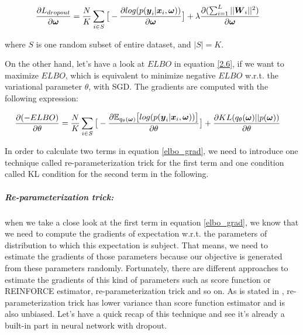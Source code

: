 \begin{equation}
\begin{aligned} \label{dropout_grad}
\frac{\partial L_{dropout}}{\partial \boldsymbol \omega} &=\frac{N}{K}\sum_{i \in S}\big[-\frac{\partial log(p(\boldsymbol y_{i}| \boldsymbol x_{i}, \boldsymbol \omega))}{\partial \boldsymbol \omega}\big] + \lambda\frac{\partial (\sum_{i=1}^{L} ||\boldsymbol W_{i}||^{2})}{\partial \boldsymbol \omega}
\end{aligned}
\end{equation}

where $S$ is one random subset of entire dataset, and $|S| = K$.

On the other hand, let's have a look at $ELBO$ in equation \ref{2.6}, if we want to maximize $ELBO$, which is equivalent to minimize negative $ELBO$ w.r.t. the variational parameter $\theta$, with SGD. The gradients are computed with the following expression:

\begin{equation}
\begin{aligned} \label{elbo_grad}
\frac{\partial (-ELBO)}{\partial \theta} &=\frac{N}{K}\sum_{i \in S}\big[-\frac{\partial \mathbb E_{q_{\theta}(\boldsymbol \omega)} \big[log(p(\boldsymbol y_{i}| \boldsymbol x_{i}, \boldsymbol \omega))\big]}{\partial \theta}\big] + \frac{\partial KL(q_{\theta}(\boldsymbol \omega)||p(\boldsymbol \omega))}{\partial \theta}
\end{aligned}
\end{equation}

In order to calculate two terms in equation \ref{elbo_grad}, we need to introduce one technique called re-parameterization trick\cite{kingma2013auto} for the first term and one condition called KL condition\cite{gal2016uncertainty} for the second term in the following.

\subparagraph{Re-parameterization trick:} when we take a close look at the first term in equation \ref{elbo_grad}, we know that we need to compute the gradients of expectation w.r.t. the parameters of distribution to which this expectation is subject. That means, we need to estimate the gradients of those parameters because our objective is generated from these parameters randomly. Fortunately, there are different approaches to estimate the gradients of this kind of parameters such as score function or REINFORCE estimator\cite{williams1992simple}, re-parameterization trick \cite{kingma2013auto} and so on. As is stated in \cite{kingma2013auto}, re-parameterization trick has lower variance than score function estimator and is also unbiased. Let's have a quick recap of this technique and see it's already a built-in part in neural network with dropout.

